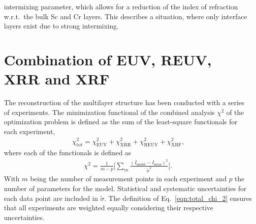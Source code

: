 intermixing parameter, which allows for a reduction of the index of refraction w.r.t.~the bulk Sc and Cr layers. This describes a situation, where only interface layers exist due to strong intermixing.



\section{Combination of EUV, REUV, XRR and XRF}

The reconstruction of the multilayer structure has been conducted with a series of experiments. The minimization functional of the combined analysis $\chi^2$ of the optimization problem is defined as the sum of the least-square functionals for each experiment,
\begin{align}
\chi^2_\text{tot} = \chi^2_\text{EUV} +\chi^2_\text{XRR} +\chi^2_\text{REUV} + \chi^2_\text{XRF}\text{,} \label{eqn:total_chi_2}
\end{align}
where each of the functionals is defined as
\begin{align}
\chi^2 = \frac{1}{m - p} \bigg[\sum\limits_{m} \frac{(I_\text{model} - I_\text{meas})^2}{\tilde{\sigma}^2} \bigg] \text{.}
\end{align}
With $m$ being the number of measurement points in each experiment and $p$ the number of parameters for the model. Statistical and systematic uncertainties for each data point are included in $\tilde{\sigma}$. The definition of Eq.~\eqref{eqn:total_chi_2} ensures that all experiments are weighted equally considering their respective uncertainties.

